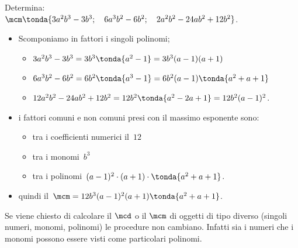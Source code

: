 
\begin{esempio}{}{}
Determina:\\
\(\mcm \tonda{3a^{2}b^{3}-3b^{3};\quad 6a^{3}b^{2}-6b^{2};
            \quad 2a^{2}b^{2}-24ab^{2}+12b^{2}} \).
\begin{itemize}[nosep]
\item Scomponiamo in fattori i singoli polinomi;
\begin{itemize}[nosep]
\item \(3a^{2}b^{3}-3b^{3}=3b^{3} \tonda{a^{2}-1} =3b^{3}(a-1)(a+1)\)
\item \(6a^{3}b^{2}-6b^{2}=6b^{2} \tonda{a^{3}-1} =
        6b^{2}(a-1) \tonda{a^{2}+a+1} \)
\item \(12a^{2}b^{2}-24ab^{2}+12b^{2}=12b^{2} \tonda{a^{2}-2a+1} =
        12b^{2}(a-1)^{2}\).
\end{itemize}
\item i fattori comuni e non comuni presi con il massimo esponente sono:
\begin{itemize}[nosep]
\item tra i coefficienti numerici il~\(12\)
\item tra i monomi~\(b^{3}\)
\item tra i polinomi~\((a-1)^{2}\cdot (a+1)\cdot  \tonda{a^{2}+a+1} \).
\end{itemize}
\item quindi il~\(\mcm=12b^{3}(a-1)^{2}(a+1) \tonda{a^{2}+a+1} \).
\end{itemize}
\end{esempio}

\begin{osservazione}{}{}
Se viene chiesto di calcolare il \(\mcd\) o il \(\mcm\) di 
oggetti di tipo diverso (singoli numeri, monomi, polinomi) le procedure  
non cambiano. 
Infatti sia i numeri che i monomi possono essere visti come particolari 
polinomi.
\end{osservazione}

